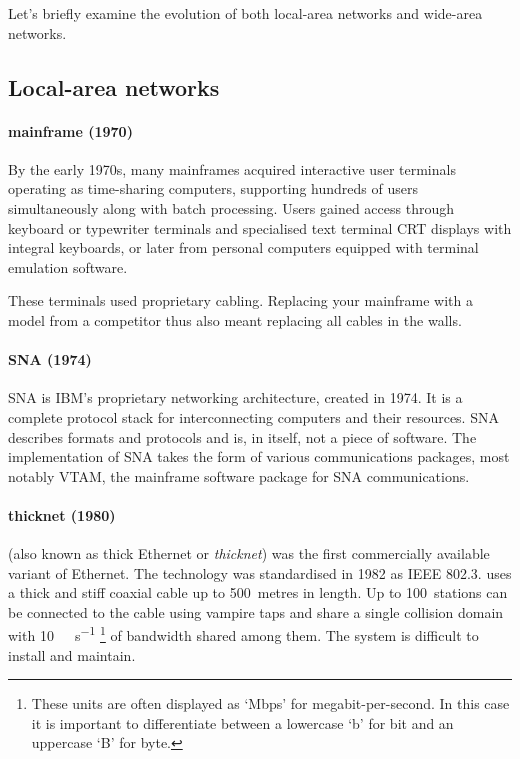 {Let's briefly examine the evolution of both local-area networks and wide-area networks.

\subsection{Local-area networks}
\label{sec:network-evolution-lan}

\paragraph{mainframe (1970)}%
By the early 1970s, many mainframes acquired interactive user terminals operating as time-sharing computers, supporting hundreds of users simultaneously along with batch processing.
Users gained access through keyboard or typewriter terminals%
and specialised text terminal \gls{CRT} displays with integral keyboards, or later from personal computers equipped with terminal emulation software.

These terminals used proprietary cabling.
Replacing your mainframe with a model from a competitor thus also meant replacing all cables in the walls.
    
\paragraph{\acl{SNA} (1974)}
\Gls{SNA} is IBM's proprietary networking architecture, created in 1974.
It is a complete protocol stack for interconnecting computers and their resources.
\gls{SNA} describes formats and protocols and is, in itself, not a piece of software.
The implementation of \gls{SNA} takes the form of various communications packages, most notably \gls{VTAM}, the mainframe software package for \gls{SNA} communications.
    
\paragraph{thicknet (1980)}%
 (also known as thick Ethernet or \emph{thicknet}) was the first commercially available variant of Ethernet.
The technology was standardised in 1982 as \acs{IEEE} 802.3.
 uses a thick and stiff coaxial cable up to 500~metres in length.
Up to 100~stations can be connected to the cable using vampire taps and share a single collision domain with \SI{10}{\mega\bit\per\second}%
   \footnote{These units are often displayed as `Mbps' for megabit-per-second. In this case it is important to differentiate between a lowercase `b' for bit and an uppercase `B' for byte.}
of bandwidth shared among them.
The system is difficult to install and maintain.

}
